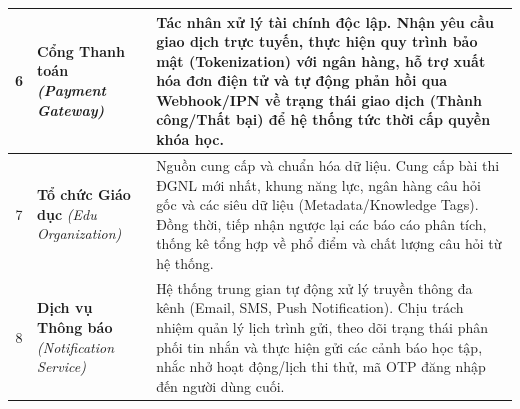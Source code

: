 \documentclass[a4paper,12pt]{article}
\begin{document}
\begin{longtable}{|c|p{3.8cm}|p{9.5cm}|}
		6 & \textbf{Cổng Thanh toán} \newline \textit{(Payment Gateway)} & Tác nhân xử lý tài chính độc lập. Nhận yêu cầu giao dịch trực tuyến, thực hiện quy trình bảo mật (Tokenization) với ngân hàng, hỗ trợ xuất hóa đơn điện tử và tự động phản hồi qua Webhook/IPN về trạng thái giao dịch (Thành công/Thất bại) để hệ thống tức thời cấp quyền khóa học. \\ \hline
		7 & \textbf{Tổ chức Giáo dục} \newline \textit{(Edu Organization)} & Nguồn cung cấp và chuẩn hóa dữ liệu. Cung cấp bài thi ĐGNL mới nhất, khung năng lực, ngân hàng câu hỏi gốc và các siêu dữ liệu (Metadata/Knowledge Tags). Đồng thời, tiếp nhận ngược lại các báo cáo phân tích, thống kê tổng hợp về phổ điểm và chất lượng câu hỏi từ hệ thống. \\ \hline
		8 & \textbf{Dịch vụ Thông báo} \newline \textit{(Notification Service)} & Hệ thống trung gian tự động xử lý truyền thông đa kênh (Email, SMS, Push Notification). Chịu trách nhiệm quản lý lịch trình gửi, theo dõi trạng thái phân phối tin nhắn và thực hiện gửi các cảnh báo học tập, nhắc nhở hoạt động/lịch thi thử, mã OTP đăng nhập đến người dùng cuối. \\ \hline
	\end{longtable}
	
\end{document}
